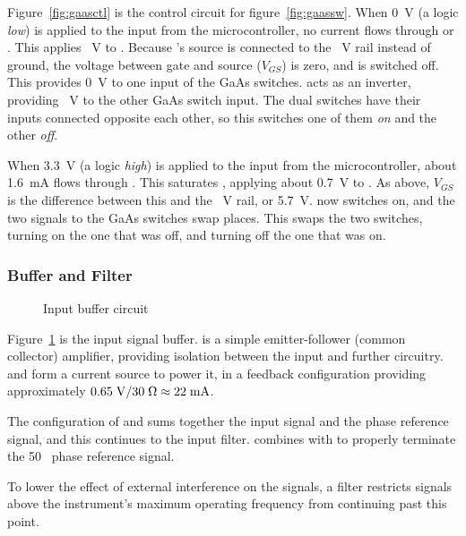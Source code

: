 Figure~\ref{fig:gaasctl} is the control circuit for figure~\ref{fig:gaassw}.
When 0~V (a logic \emph{low}) is applied to the input from the
microcontroller, no current flows through  or .
This applies ~V to . Because 's source is
connected to the ~V rail instead of ground, the voltage between gate
and source ($V_{GS}$) is zero, and  is switched off.
This provides 0~V to one input of the GaAs switches.  acts
as an inverter, providing ~V to the other GaAs switch input. The
dual switches have their inputs connected opposite each other, so this
switches one of them \emph{on} and the other \emph{off}.

When 3.3~V (a logic \emph{high}) is applied to the input from the
microcontroller, about 1.6~mA flows through . This
saturates , applying about 0.7~V to . As above,
$V_{GS}$ is the difference between this and the ~V rail, or
5.7~V.  now switches on, and the two signals to the GaAs
switches swap places. This swaps the two switches, turning on the one that was
off, and turning off the one that was on.


\subsubsection{Buffer and Filter}

\begin{figure}[H]
\centering
{}
\caption{Input buffer circuit}
\label{fig:buffer}
\end{figure}

Figure~\ref{fig:buffer} is the input signal buffer.  is a simple
emitter-follower (common collector) amplifier, providing isolation
between the input and further circuitry.  and  form
a current source to power it, in a feedback configuration providing
approximately $0.65\;\mathrm{V} / 30\;\Omega \approx 22\;\mathrm{mA}$.

The configuration of  and  sums together
the input signal and the phase reference signal, and this continues to the
input filter.  combines with  to properly
terminate the 50~\Ohm{} phase reference signal.

To lower the effect of external interference on the signals, a filter restricts
signals above the instrument's maximum operating frequency from continuing
past this point.

